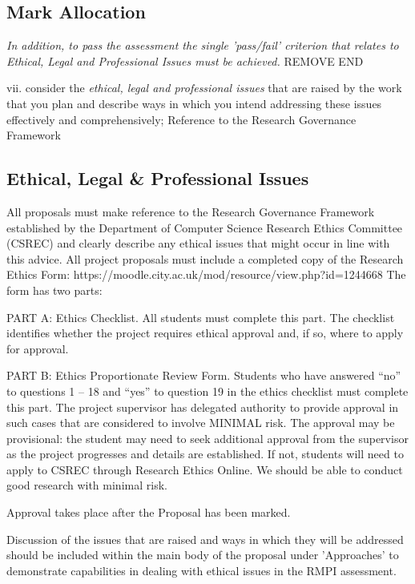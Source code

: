 \subsection{Mark Allocation}

\textit{In addition, to pass the assessment the single 'pass/fail' criterion that relates to Ethical, Legal and Professional Issues must be achieved.}
REMOVE END

vii. consider the \textit{ethical, legal and professional issues} that are raised by the work that you plan and describe ways in which you intend addressing these issues effectively and comprehensively; 
Reference to the Research Governance Framework \parencite{CSREC:2020}

\subsection{Ethical, Legal \& Professional Issues}

All proposals must make reference to the Research Governance Framework established by the Department of Computer Science Research Ethics Committee (CSREC) and clearly describe any ethical issues that might occur in line with this advice.
All project proposals must include a completed copy of the Research Ethics Form:   https://moodle.city.ac.uk/mod/resource/view.php?id=1244668 
The form has two parts:

PART A: Ethics Checklist. All students must complete this part.  The checklist identifies whether the project requires ethical approval and, if so, where to apply for approval.


PART B: Ethics Proportionate Review Form. Students who have answered “no” to questions 1 – 18 and “yes” to question 19 in the ethics checklist must complete this part. The project supervisor has delegated authority to provide approval in such cases that are considered to involve MINIMAL risk. 
The approval may be provisional: the student may need to seek additional approval from the supervisor as the project progresses and details are established. If not, students will need to apply to CSREC through Research Ethics Online.  We should be able to conduct good research with minimal risk.
                       
Approval takes place after the Proposal has been marked.  

Discussion of the issues that are raised and ways in which they will be addressed should be included within the main body of the proposal under 'Approaches' to demonstrate capabilities in dealing with ethical issues in the RMPI assessment. 

